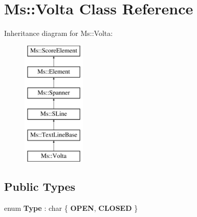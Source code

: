 \hypertarget{class_ms_1_1_volta}{}\section{Ms\+:\+:Volta Class Reference}
\label{class_ms_1_1_volta}
Inheritance diagram for Ms\+:\+:Volta\+:\begin{figure}[H]
\begin{center}
\leavevmode
\includegraphics[height=6.000000cm]{class_ms_1_1_volta}
\end{center}
\end{figure}
\subsection*{Public Types}
\begin{DoxyCompactItemize}
\item 
\mbox{\label{class_ms_1_1_volta_ad3b71fe30b1a50e45d9ae3b402d6f903}} 
enum {\bfseries Type} \+: char \{ {\bfseries O\+P\+EN}, 
{\bfseries C\+L\+O\+S\+ED}
 \}
\end{DoxyCompactItemize}
